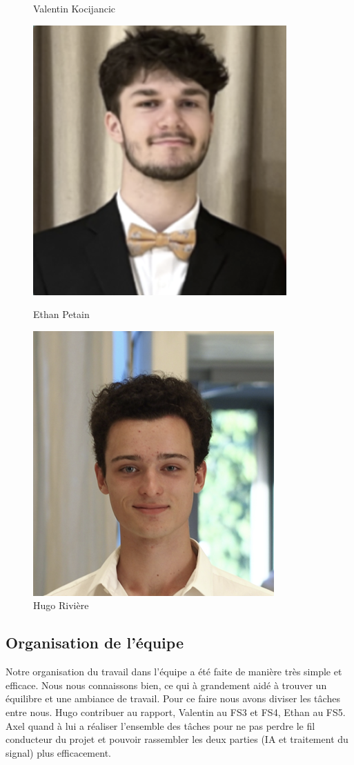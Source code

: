 \documentclass[a4paper,11pt]{article}
\begin{document}
\begin{figure}[H]
\begin{minipage}{0.20\textwidth}
\caption*{Valentin Kocijancic}
\end{minipage}
\hfill
\begin{minipage}{0.20\textwidth}
\centering
\includegraphics[scale=0.7]{images/ethan.png}
\caption*{Ethan Petain}
\end{minipage}
\hfill
\begin{minipage}{0.20\textwidth}
\centering
\includegraphics[scale=0.7]{images/hugo.png}
\caption*{Hugo Rivière}
\end{minipage}
\hfill
\end{figure}
			
\subsection{Organisation de l’équipe}
Notre organisation du travail dans l’équipe a été faite de manière très simple et efficace. Nous  nous connaissons bien, ce qui à grandement aidé à trouver un équilibre et une ambiance de travail. Pour ce faire nous avons diviser les tâches entre nous. Hugo contribuer au rapport, Valentin au FS3 et FS4, Ethan au FS5. Axel quand à lui a réaliser l’ensemble des tâches pour ne pas perdre le fil conducteur du projet et pouvoir rassembler les deux parties (IA et traitement du signal) plus efficacement.
\end{document}
